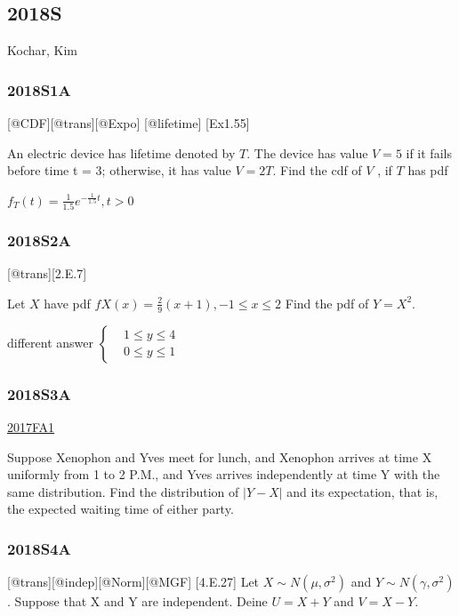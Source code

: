 \documentclass[6pt,Portrait]{article}
\begin{document}
\hypertarget{s-11}{%
\subsection{2018S}\label{s-11}}

Kochar, Kim

\hypertarget{s1a-1}{%
\subsubsection{2018S1A}\label{s1a-1}}

{[}@CDF{]}{[}@trans{]}{[}@Expo{]} {[}@lifetime{]} {[}Ex1.55{]}

An electric device has lifetime denoted by \(T\). The device has value
\(V=5\) if it fails before time t = 3; otherwise, it has value
\(V = 2T\). Find the cdf of \(V\) , if \(T\) has pdf

\(f_T(t)=\frac1{1.5}e^{-\frac1{1.5}t}, t>0\)

\hypertarget{s2a-2}{%
\subsubsection{2018S2A}\label{s2a-2}}

{[}@trans{]}{[}2.E.7{]}

Let \(X\) have pdf \(fX(x)=\frac29(x+1), -1\le x\le2\) Find the pdf of
\(Y=X^2\).

{ different answer \(\begin{cases}&1\le y\le4\\& 0\le y\le1\end{cases}\)
}

\hypertarget{s3a-2}{%
\subsubsection{2018S3A}\label{s3a-2}}

\protect\hyperlink{fa1-3}{2017FA1}

Suppose Xenophon and Yves meet for lunch, and Xenophon arrives at time X
uniformly from 1 to 2 P.M., and Yves arrives independently at time Y
with the same distribution. Find the distribution of \(|Y-X|\) and its
expectation, that is, the expected waiting time of either party.

\hypertarget{s4a-2}{%
\subsubsection{2018S4A}\label{s4a-2}}

{[}@trans{]}{[}@indep{]}{[}@Norm{]}{[}@MGF{]} {[}4.E.27{]} Let
\(X\sim N(\mu,\sigma^2)\) and \(Y\sim N(\gamma,\sigma^2)\). Suppose that
X and Y are independent. Deine \(U=X+Y\) and \(V=X-Y\).
\end{document}

